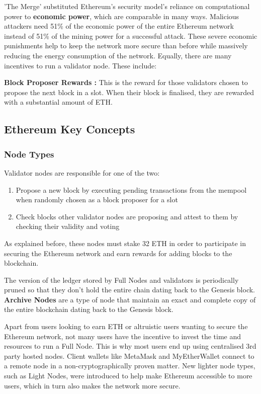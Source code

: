 'The Merge' substituted Ethereum's security model's reliance on computational power to \textbf{economic power}, which are comparable in many ways. Malicious attackers need 51\% of the economic power of the entire Ethereum network instead of 51\% of the mining power for a successful attack. These severe economic punishments help to keep the network more secure than before while massively reducing the energy consumption of the network. 
\newline \newline
Equally, there are many incentives to run a validator node. These include:

\textbf{Block Proposer Rewards :}
This is the reward for those validators chosen to propose the next block in a slot. When their block is finalised, they are rewarded with a substantial amount of ETH.



\subsection{Ethereum Key Concepts}

\subsubsection{Node Types}

Validator nodes are responsible for one of the two:
\begin{enumerate}
    \item Propose a new block by executing pending transactions from the mempool when randomly chosen as a block proposer for a slot
    \item Check blocks other validator nodes are proposing and attest to them by checking their validity and voting 
\end{enumerate}
As explained before, these nodes must stake 32 ETH in order to participate in securing the Ethereum network and earn rewards for adding blocks to the blockchain.

The version of the ledger stored by Full Nodes and validators is periodically pruned so that they don't hold the entire chain dating back to the Genesis block. \textbf{Archive Nodes} are a type of node that maintain an exact and complete copy of the entire blockchain dating back to the Genesis block. 

Apart from users looking to earn ETH or altruistic users wanting to secure the Ethereum network, not many users have the incentive to invest the time and resources to run a Full Node. This is why most users end up using centralised 3rd party hosted nodes. Client wallets like MetaMask and MyEtherWallet connect to a remote node in a non-cryptographically proven matter. New lighter node types, such as Light Nodes, were introduced to help make Ethereum accessible to more users, which in turn also makes the network more secure.

